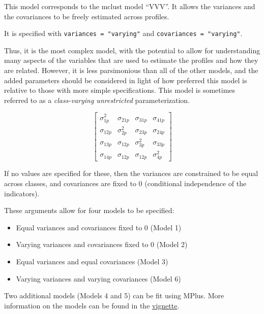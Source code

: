 \documentclass[
  english,
  man]{apa6}
\providecommand{\tightlist}{%
  \setlength{\itemsep}{0pt}\setlength{\parskip}{0pt}}
\begin{document}
This model corresponds to the mclust model \enquote{VVV}. It allows the variances and the covariances to be freely estimated across profiles.

It is specified with \texttt{variances\ =\ "varying"} and \texttt{covariances\ =\ "varying"}.

Thus, it is the most complex model, with the potential to allow for understanding many aspects of the variables that are used to estimate the profiles and how they are related. However, it is less parsimonious than all of the other models, and the added parameters should be considered in light of how preferred this model is relative to those with more simple specifications. This model is sometimes referred to as a \emph{class-varying unrestricted} parameterization.

\[
\left[ \begin{matrix} { \sigma  }_{ 1p }^{ 2 } & { \sigma  }_{ 21p } & { \sigma  }_{ 31p } & { \sigma  }_{ 41p } \\ { \sigma  }_{ 12p } & { \sigma  }_{ 2p }^{ 2 } & { \sigma  }_{ 23p } & { \sigma  }_{ 24p } \\ { \sigma  }_{ 13p } & { \sigma  }_{ 12p } & { \sigma  }_{ 3p }^{ 2 } & { \sigma  }_{ 33p } \\ { \sigma  }_{ 14p } & { \sigma  }_{ 12p } & { \sigma  }_{ 12p } & { \sigma  }_{ 4p }^{ 2 } \end{matrix} \right] 
\]

If no values are specified for these, then the variances are constrained to be
equal across classes, and covariances are fixed to 0 (conditional independence
of the indicators).

These arguments allow for four models to be specified:

\begin{itemize}
\tightlist
\item
  Equal variances and covariances fixed to 0 (Model 1)
\item
  Varying variances and covariances fixed to 0 (Model 2)
\item
  Equal variances and equal covariances (Model 3)
\item
  Varying variances and varying covariances (Model 6)
\end{itemize}

Two additional models (Models 4 and 5) can be fit using MPlus. More information
on the models can be found in the
\href{https://data-edu.github.io/tidyLPA/articles/Introduction_to_tidyLPA.html}{vignette}.
\end{document}
